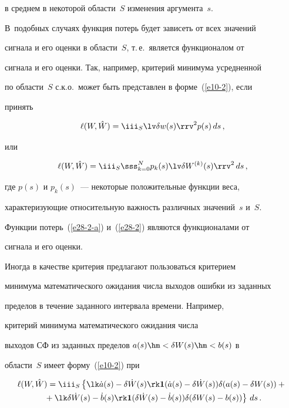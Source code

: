 в среднем в некоторой области~$S$ изменения аргумента~$s$. 


В~подобных случаях функция потерь будет зависеть от всех значений


сигнала и его оценки в области~$S$, т.\,е.\ является функционалом от


сигнала и его оценки. Так, например, критерий минимума усредненной


по области~$S$ с.к.о.\ может быть представлен в форме~(\ref{e10-2}), если


принять


    \begin{equation}


    \ell (W,\hat W) =\iii_S \lv \delta w(s)\rrv^2 p(s)\,ds\,,


    \label{e28-2-a}


    \end{equation}


    или


    \begin{equation}


    \ell (W,\hat W) =\iii_S \sss_{k=0}^N p_k (s) \lv \delta W^{(k)} (s)\rrv^2\, ds\,,


    \label{e28-2}


    \end{equation}


где  $p(s)$ и $p_k(s)$~--- некоторые положительные функции веса,


характеризующие относительную важность различных значений~$s$ и~$S$.


Функции потерь~(\ref{e28-2-a}) и~(\ref{e28-2}) являются функционалами  от


сигнала и его оценки.





Иногда в качестве критерия предлагают пользоваться критерием


 минимума математического ожидания числа выходов ошибки из заданных


 пределов в течение заданного интервала времени. Например,


 критерий минимума математического ожидания чис\-ла


 выходов СФ из заданных пределов  $a(s) \hm<\delta W(s) \hm< b(s)$ в


 области~$S$ имеет форму~(\ref{e10-2}) при


\begin{multline*}


\ell(W,\hat W) = \iii_S 


\left\{ \lk \dot a(s) -\delta \dot W(s)\rk \mathbf{1} (\dot a(s) -\delta \dot W(s)) \delta ( a(s) -


\delta W(s))+{}\right.\\


\left.{}+ \lk \delta \dot W(s)-\dot b(s)\rk \mathbf{1} (\delta \dot W(s)- \dot b(s)) 


\delta ( \delta W(s)- b(s))


\right\}\, ds\,. %


\end{multline*}


